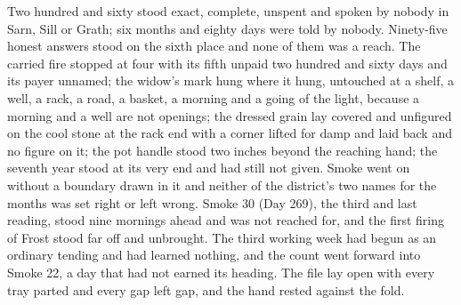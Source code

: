 Two hundred and sixty stood exact, complete, unspent and spoken by nobody in Sarn, Sill or Grath; six months and eighty days were told by nobody. Ninety-five honest answers stood on the sixth place and none of them was a reach. The carried fire stopped at four with its fifth unpaid two hundred and sixty days and its payer unnamed; the widow's mark hung where it hung, untouched at a shelf, a well, a rack, a road, a basket, a morning and a going of the light, because a morning and a well are not openings; the dressed grain lay covered and unfigured on the cool stone at the rack end with a corner lifted for damp and laid back and no figure on it; the pot handle stood two inches beyond the reaching hand; the seventh year stood at its very end and had still not given. Smoke went on without a boundary drawn in it and neither of the district's two names for the months was set right or left wrong. Smoke 30 (Day 269), the third and last reading, stood nine mornings ahead and was not reached for, and the first firing of Frost stood far off and unbrought. The third working week had begun as an ordinary tending and had learned nothing, and the count went forward into Smoke 22, a day that had not earned its heading. The file lay open with every tray parted and every gap left gap, and the hand rested against the fold.
